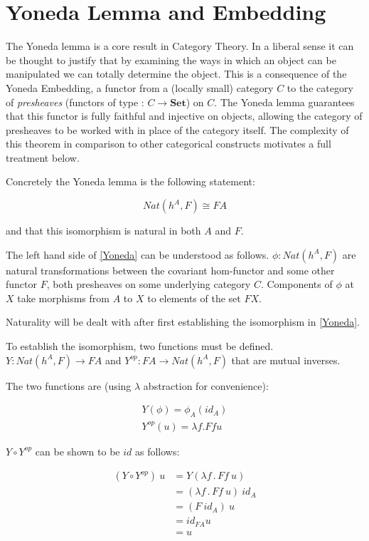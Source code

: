 \documentclass[a4paper,12pt]{article}
\begin{document}
\section{Yoneda Lemma and Embedding}
The Yoneda lemma is a core result in Category Theory. In a liberal sense it can
be thought to justify that by examining the ways in which an object can be
manipulated we can totally determine the object. This is a consequence of the
Yoneda Embedding, a functor from a (locally small) category $C$ to the category of
\textit{presheaves} (functors of type : $C \rightarrow \textbf{Set}$) on $C$.
The Yoneda lemma guarantees that this functor is fully faithful and injective on
objects, allowing the category of presheaves to be worked with in place of the
category itself. The complexity of this theorem in comparison to other
categorical constructs motivates a full treatment below.

Concretely the Yoneda lemma is the following statement:

\begin{equation}
    Nat(h^{A}, F) \cong FA
    \label{Yoneda}
\end{equation}

and that this isomorphism is natural in both $A$ and $F$.

The left hand side of \ref{Yoneda} can be understood as follows. $\phi : Nat(h^{A},
F)$ are natural transformations between the covariant hom-functor and some other
functor $F$, both presheaves on some underlying category $C$. Components of
$\phi$ at $X$ take morphisms from $A$ to $X$ to elements of the set $FX$.

Naturality will be dealt with after first establishing the isomorphism in
\ref{Yoneda}.

To establish the isomorphism, two functions must be defined. $Y: Nat(h^{A}, F)
\rightarrow FA$ and $Y^{op}: FA \rightarrow Nat(h^{A}, F)$ that are mutual
inverses.

The two functions are (using $\lambda$ abstraction for convenience):

\begin{align*}
    Y(\phi) = \phi_{A}(id_{A}) \\
    Y^{op}(u) = \lambda f . F f u
\end{align*}

$Y \circ Y^{op}$ can be shown to be $id$ as follows:

\begin{align*}
    (Y \circ Y^{op}) \ u &= Y (\lambda f \,.\, F f \ u) \\
    &= (\lambda f \,.\, F f \: u ) \ id_{A} \\
    &= (F \ id_{A}) \ u \\
    &=  id_{FA} u \\
    &= u
\end{align*}
\end{document}
